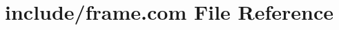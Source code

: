 \hypertarget{home_2abonfi_2_c_f_d__codes_2_eul_f_s_83_84_2include_2frame_8com}{\section{include/frame.com File Reference}
\label{home_2abonfi_2_c_f_d__codes_2_eul_f_s_83_84_2include_2frame_8com}
}
